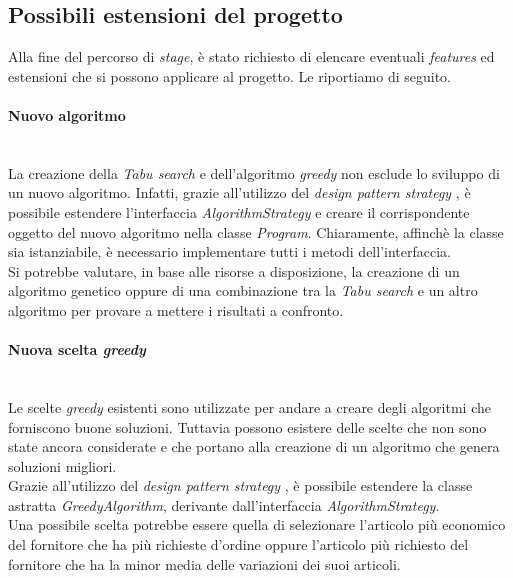 \subsection{Possibili estensioni del progetto}
\label{sec:estensioni-progetto}
\noindent Alla fine del percorso di \textit{stage}, è stato richiesto di
elencare eventuali \textit{features} ed estensioni che si possono
applicare al progetto. Le riportiamo di seguito.
\vspace*{0.3cm}
\noindent \paragraph{Nuovo algoritmo}\hfill\\
La creazione della \textit{Tabu search} e dell'algoritmo \textit{greedy} non esclude
lo sviluppo di un nuovo algoritmo. Infatti, grazie all'utilizzo del \textit{design
pattern strategy} \cite{site:refactoring-guru} \cite{site:rcardin}, è possibile estendere l'interfaccia
\textit{AlgorithmStrategy} e 
creare il corrispondente oggetto del nuovo algoritmo nella classe \textit{Program}.
Chiaramente, affinchè la classe sia istanziabile, è necessario
implementare tutti i metodi dell'interfaccia.\\
Si potrebbe valutare, in base alle risorse a disposizione, la creazione di un
algoritmo genetico oppure di una combinazione tra la \textit{Tabu search} e un altro algoritmo
per provare a mettere i risultati a confronto.
\vspace*{0.3cm}
\noindent \paragraph{Nuova scelta \textit{greedy}}\hfill\\
Le scelte \textit{greedy} esistenti sono utilizzate per andare
a creare degli algoritmi che forniscono buone soluzioni.
Tuttavia possono esistere delle scelte che non sono state ancora
considerate e che portano alla creazione di un algoritmo
che genera soluzioni migliori.\\
Grazie all'utilizzo del \textit{design
pattern strategy} \cite{site:refactoring-guru} \cite{site:rcardin}, è possibile estendere
la classe astratta \textit{GreedyAlgorithm}, derivante dall'interfaccia
\textit{AlgorithmStrategy}.\\
Una possibile scelta potrebbe essere quella di selezionare
l'articolo più economico del fornitore che ha più richieste d'ordine
oppure l'articolo più richiesto del fornitore
che ha la minor media delle variazioni dei suoi articoli.
